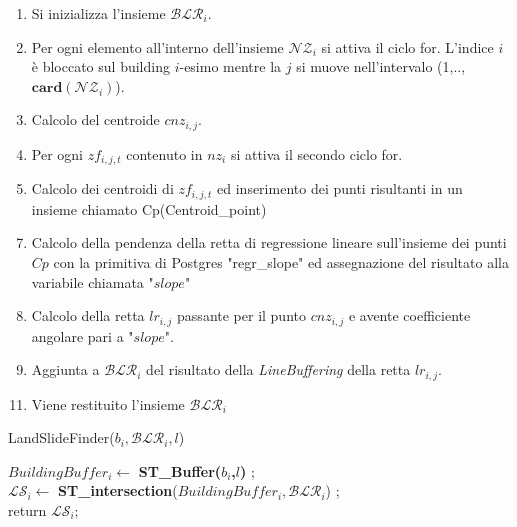 \begin{enumerate}
	\item Si inizializza l'insieme $\mathcal{BLR}_i$.
	\item Per ogni elemento all'interno dell'insieme $\mathcal{NZ}_i$ si attiva il ciclo for. L'indice $i$ è bloccato sul building $i$-esimo mentre la $j$ si muove nell'intervalo (1,..,$\mathbf{card}(\mathcal{NZ}_i)$).
	\item Calcolo del centroide $cnz_{i,j}$.
	\item Per ogni $zf_{i,j,t}$ contenuto in $nz_i$ si attiva il secondo ciclo for. 
	\item Calcolo dei centroidi di $zf_{i,j,t}$ ed inserimento dei punti risultanti in un insieme chiamato Cp(Centroid\_point)
\end{enumerate}
\begin{enumerate}
	\setcounter{enumi}{6}
	\item Calcolo della pendenza della retta di regressione lineare sull'insieme dei punti $Cp$ con la primitiva di Postgres "regr\_slope" ed assegnazione del risultato alla variabile chiamata "$slope$"
	\item Calcolo della retta $lr_{i,j}$ passante per il punto $cnz_{i,j}$ e avente coefficiente angolare pari a "$slope$".
	\item Aggiunta a $\mathcal{BLR}_i$ del risultato della \textit{LineBuffering} della retta $lr_{i,j}$.
\end{enumerate}
\begin{enumerate}
	\setcounter{enumi}{10}
	\item Viene restituito l'insieme $\mathcal{BLR}_i$
\end{enumerate}


\begin{algorithm}[H]
	
	\IncMargin{1em}
	\caption{LandSlideFinder($b_i , \mathcal{BLR}_i, l$) }
	\label{alg:four}
	\BlankLine
	\SetAlgoNoLine
	$ BuildingBuffer_i  \leftarrow $ \textbf{ST\_Buffer($b_i$,$l$)} ;\\
	$ \mathcal{LS}_i \leftarrow $ \textbf{ST\_intersection}($BuildingBuffer_i,\mathcal{BLR}_i $) ;\\
	return $\mathcal{LS}_i;$
\end{algorithm}

